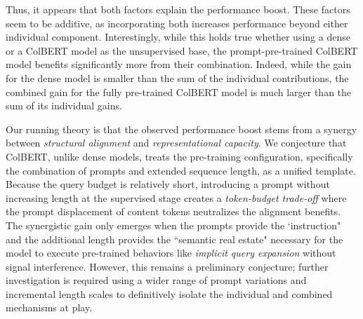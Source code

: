 Thus, it appears that both factors explain the performance boost. These factors seem to be additive, as incorporating both increases performance beyond either individual component. Interestingly, while this holds true whether using a dense or a ColBERT model as the unsupervised base, the prompt-pre-trained ColBERT model benefits significantly more from their combination. Indeed, while the gain for the dense model is smaller than the sum of the individual contributions, the combined gain for the fully pre-trained ColBERT model is much larger than the sum of its individual gains. 

Our running theory is that the observed performance boost stems from a synergy between \emph{structural alignment} and \emph{representational capacity}. We conjecture that ColBERT, unlike dense models, treats the pre-training configuration, specifically the combination of prompts and extended sequence length, as a unified template. Because the query budget is relatively short, introducing a prompt without increasing length at the supervised stage creates a \emph{token-budget trade-off} where the prompt displacement of content tokens neutralizes the alignment benefits. The synergistic gain only emerges when the prompts provide the `instruction" and the additional length provides the ``semantic real estate" necessary for the model to execute pre-trained behaviors like \emph{implicit query expansion} without signal interference. However, this remains a preliminary conjecture; further investigation is required using a wider range of prompt variations and incremental length scales to definitively isolate the individual and combined mechanisms at play.


